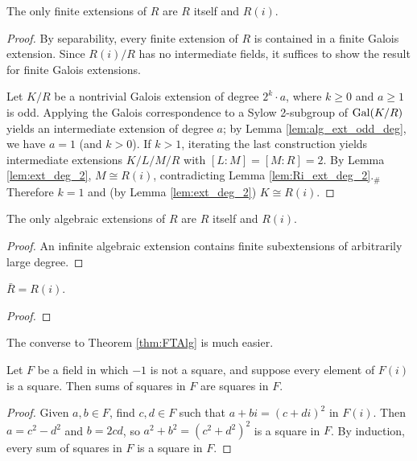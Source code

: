 \begin{theorem}
  \label{thm:FTAlg}
  \leanok
  The only finite extensions of $R$ are $R$ itself and $R(i)$.
\end{theorem}
\begin{proof}
  \leanok
  By separability, every finite extension of $R$ is contained in a finite Galois extension. Since $R(i)/R$ has no intermediate fields, it suffices to show the result for finite Galois extensions.
  
  Let $K/R$ be a nontrivial Galois extension of degree $2^k\cdot a$, where $k\geq 0$ and $a\geq1$ is odd. Applying the Galois correspondence to a Sylow 2-subgroup of $\operatorname{Gal}(K/R)$ yields an intermediate extension of degree $a$; by Lemma \ref{lem:alg_ext_odd_deg}, we have $a=1$ (and $k>0$). If $k>1$, iterating the last construction yields intermediate extensions $K/L/M/R$ with $[L:M]=[M:R]=2$. By Lemma \ref{lem:ext_deg_2}, $M\cong R(i)$, contradicting Lemma \ref{lem:Ri_ext_deg_2}.$_\#$ Therefore $k=1$ and (by Lemma \ref{lem:ext_deg_2}) $K\cong R(i)$.
\end{proof}

\begin{corollary}
  \label{cor:FTAlg_alg}
  \leanok
  The only algebraic extensions of $R$ are $R$ itself and $R(i)$.
\end{corollary}
\begin{proof}
  \leanok
  An infinite algebraic extension contains finite subextensions of arbitrarily large degree.
\end{proof}

\begin{corollary}
  \label{cor:RCF_ac}
  \leanok
  $\bar{R}=R(i)$.
\end{corollary}
\begin{proof}
  \leanok
\end{proof}

The converse to Theorem \ref{thm:FTAlg} is much easier.

\begin{lemma}
  \label{lem:sumsq_is_sq}
  \leanok
  Let $F$ be a field in which $-1$ is not a square, and suppose every element of $F(i)$ is a square. Then sums of squares in $F$ are squares in $F$.
\end{lemma}
\begin{proof}
  \leanok
  Given $a,b\in F$, find $c,d\in F$ such that $a+bi=(c+di)^2$ in $F(i)$. Then $a=c^2-d^2$ and $b=2cd$, so $a^2+b^2=(c^2+d^2)^2$ is a square in $F$. By induction, every sum of squares in $F$ is a square in $F$.
\end{proof}

